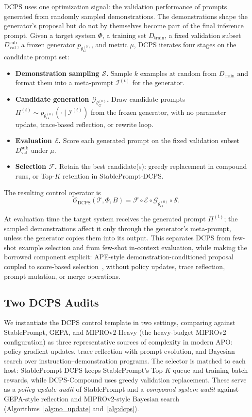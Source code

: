 \documentclass[runningheads]{llncs}
\begin{document}
DCPS uses one optimization signal: the validation performance of prompts generated from randomly sampled demonstrations. The demonstrations shape the generator's proposal but do not by themselves become part of the final inference prompt. Given a target system $\Phi$, a training set $D_{\mathrm{train}}$, a fixed validation subset $D_{\mathrm{val}}^{\mathrm{sub}}$, a frozen generator $p_{\theta_G^{(0)}}$, and metric $\mu$, DCPS iterates four stages on the candidate prompt set:
\begin{itemize}
    \item \textbf{Demonstration sampling $\mathcal{S}$.} Sample $k$ examples at random from $D_{\mathrm{train}}$ and format them into a meta-prompt $\mathcal{I}^{(t)}$ for the generator.
    \item \textbf{Candidate generation $\mathcal{G}_{\theta_G^{(0)}}$.} Draw candidate prompts $\Pi^{(t)}\sim p_{\theta_G^{(0)}}(\cdot\mid\mathcal{I}^{(t)})$ from the frozen generator, with no parameter update, trace-based reflection, or rewrite loop.
    \item \textbf{Evaluation $\mathcal{E}$.} Score each generated prompt on the fixed validation subset $D_{\mathrm{val}}^{\mathrm{sub}}$ under $\mu$.
    \item \textbf{Selection $\mathcal{F}$.} Retain the best candidate(s): greedy replacement in compound runs, or Top-$K$ retention in StablePrompt-DCPS.
\end{itemize}
The resulting control operator is
\begin{equation}
\mathcal{O}_{\mathrm{DCPS}}(\mathcal{T},\Phi,B) = \mathcal{F}\circ\mathcal{E}\circ\mathcal{G}_{\theta_G^{(0)}}\circ\mathcal{S}.
\end{equation}

At evaluation time the target system receives the generated prompt $\Pi^{(t)}$; the sampled demonstrations affect it only through the generator's meta-prompt, unless the generator copies them into its output. This separates DCPS from few-shot example selection and from few-shot in-context evaluation, while making the borrowed component explicit: APE-style demonstration-conditioned proposal coupled to score-based selection~\cite{zhou2023ape}, without policy updates, trace reflection, prompt mutation, or merge operations.

\subsection{Two DCPS Audits}
\label{sec:two-instantiations}
We instantiate the DCPS control template in two settings, comparing against StablePrompt, GEPA, and MIPROv2-Heavy (the heavy-budget MIPROv2 configuration) as three representative sources of complexity in modern APO: policy-gradient updates, trace reflection with prompt evolution, and Bayesian search over instruction--demonstration programs. The selector is matched to each host: StablePrompt-DCPS keeps StablePrompt's Top-$K$ queue and training-batch rewards, while DCPS-Compound uses greedy validation replacement. These serve as a \emph{policy-update audit} of StablePrompt and a \emph{compound-system audit} against GEPA-style reflection and MIPROv2-style Bayesian search (Algorithms~\ref{alg:no_update} and~\ref{alg:dcps}).
\end{document}
